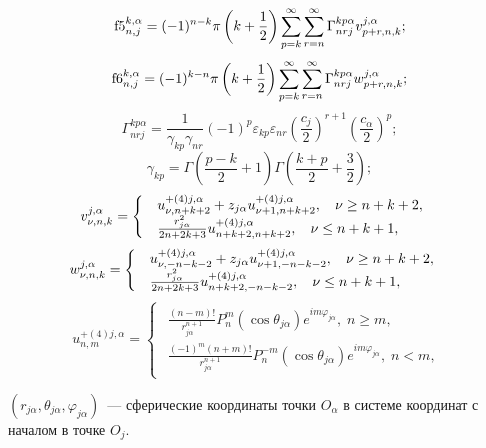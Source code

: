 \begin{theorem}
\[{\rm{f5}}_{n,j}^{k,\alpha } = (-1)^{n-k}\pi \left( {k + \frac{1}{2}} \right)\sum\limits_{p = k}^\infty  {\sum\limits_{r = n}^\infty  {\Gamma _{nrj}^{kp\alpha }v_{p + r,n,k}^{j,\alpha }} };\]
\[{\rm{f6}}_{n,j}^{k,\alpha } = (-1)^{k-n}\pi \left( {k + \frac{1}{2}} \right)\sum\limits_{p = k}^\infty  {\sum\limits_{r = n}^\infty  {\Gamma _{nrj}^{kp\alpha }w_{p + r,n,k}^{j,\alpha }} };\]
\[\Gamma _{nrj}^{kp\alpha } = \frac{1}{{{\gamma _{kp}}{\gamma _{nr}}}}{( - 1)^{p}}{\varepsilon _{kp}}{\varepsilon _{nr}}{\left( {\frac{{{{{c}}_j}}}{2}} \right)^{r + 1}}{\left( {\frac{{{{{c}}_\alpha }}}{2}} \right)^p};\]
\[{\gamma _{kp}} = \Gamma \left( {\frac{{p - k}}{2} + 1} \right)\Gamma \left( {\frac{{k + p}}{2} + \frac{3}{2}} \right);\]
\[v_{\nu ,n,k}^{j,\alpha } = \left\{ {\begin{array}{*{20}{l}}
\begin{array}{l}
u_{\nu ,n + k + 2}^{ + (4)j,\alpha } + {z_{j\alpha }}u_{\nu  + 1,n + k + 2}^{ + (4)j,\alpha },\;\;\;{\kern 1pt} \nu  \ge n + k + 2,\\
\frac{{r_{j\alpha }^2}}{{2n + 2k + 3}}u_{n + k + 2,n + k + 2}^{ + (4)j,\alpha },\;\;\;{\kern 1pt} \nu  \le n + k + 1,
\end{array}
\end{array}} \right.\]
\[w_{\nu ,n,k}^{j,\alpha } = \left\{ {\begin{array}{*{20}{l}}
\begin{array}{l}
u_{\nu , - n - k - 2}^{ + (4)j,\alpha } + {z_{j\alpha }}u_{\nu  + 1, - n - k - 2}^{ + (4)j,\alpha },\;\;\;{\kern 1pt} \nu  \ge n + k + 2,\\
\frac{{r_{j\alpha }^2}}{{2n + 2k + 3}}u_{n + k + 2, - n - k - 2}^{ + (4)j,\alpha },\;\;\;{\kern 1pt} \nu  \le n + k + 1,
\end{array}
\end{array}} \right.\]
\[{{u}}_{n,m}^{ + (4)j,\alpha } = \left\{ {\begin{array}{*{20}{l}}
\begin{array}{l}
\frac{{(n - m)!}}{{r_{j\alpha }^{n + 1}}}P_n^m(\cos {\theta _{j\alpha }}){e^{im{\varphi _{j\alpha }}}},\;n \ge m,\\
\frac{{{{( - 1)}^m}(n + m)!}}{{r_{j\alpha }^{n + 1}}}P_n^{ - m}(\cos {\theta _{j\alpha }}){e^{im{\varphi _{j\alpha }}}},\;n < m,
\end{array}
\end{array}} \right.\]

\noindent $(r_{j\alpha},\theta_{j\alpha},\varphi_{j\alpha})$~--- сферические координаты точки $O_\alpha$ в системе координат с началом в точке $O_j$.
\end{theorem}

